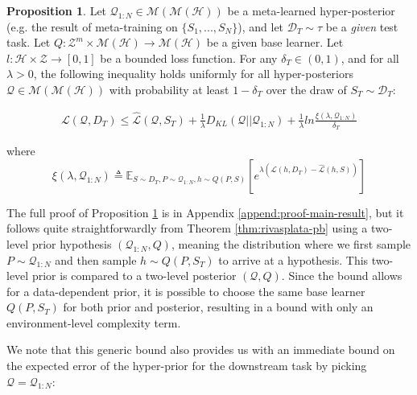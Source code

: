 \documentclass{article}
\theoremstyle{definition}
\newtheorem{proposition}{Proposition}[section]
\newcommand{\Expect}[2]{\mathbb{E}_{#1}\left [#2 \right ]}
\begin{document}
\begin{proposition} \label{thm:main-result}
	Let $\mathcal{Q}_{1:N}\in \mathcal{M}(\mathcal{M}(\mathcal{H}))$ be a meta-learned hyper-posterior (e.g. the result of meta-training on $\{S_1,...,S_N\}$), and let $\mathcal{D}_T\sim \tau$ be a \emph{given} test task. Let $Q: \mathcal{Z}^m\times\mathcal{M}(\mathcal{H})\rightarrow \mathcal{M}(\mathcal{H})$ be a given base learner. Let $l: \mathcal{H}\times \mathcal{Z}\rightarrow [0, 1]$ be a bounded loss function.
	For any $\delta_T \in (0,1)$, and for all $\lambda>0$, the following inequality holds uniformly for all hyper-posteriors $\mathcal{Q}\in \mathcal{M}(\mathcal{M}(\mathcal{H}))$ with probability at least $1-\delta_T$ over the draw of $S_T\sim \mathcal{D}_T$:
	
	\begin{align} \label{eq:main-result-generic}
	\mathcal{L}(\mathcal{Q}, D_T) \leq \hat{\mathcal{L}}(\mathcal{Q}, S_T) + \frac{1}{\lambda}D_{KL}(\mathcal{Q}||\mathcal{Q}_{1:N})
	+\frac{1}{\lambda}ln\frac{\xi(\lambda,\mathcal{Q}_{1:N})}{\delta_T}
	\end{align}
	
	
	where 
	$$\xi(\lambda,\mathcal{Q}_{1:N})\triangleq \Expect{S\sim D_T, P\sim \mathcal{Q}_{1:N}, h\sim Q(P,S)}{e^{\lambda\left (\mathcal{L}(h, D_T)-\hat{\mathcal{L}}(h, S)\right )}}$$
\end{proposition}

The full proof of Proposition \ref{thm:main-result} is in Appendix \ref{append:proof-main-result}, but it follows quite straightforwardly from Theorem \ref{thm:rivasplata-pb} using a two-level prior hypothesis $(\mathcal{Q}_{1:N}, Q)$, meaning the distribution where we first sample $P\sim \mathcal{Q}_{1:N}$ and then sample $h\sim Q(P, S_T)$ to arrive at a hypothesis. This two-level prior is compared to a two-level posterior $(\mathcal{Q}, Q)$. Since the bound allows for a data-dependent prior, it is possible to choose the same base learner $Q(P, S_T)$ for both prior and posterior, resulting in a bound with only an environment-level complexity term.

We note that this generic bound also provides us with an immediate bound on the expected error of the hyper-prior for the downstream task by picking $\mathcal{Q}=\mathcal{Q}_{1:N}$:
\end{document}
